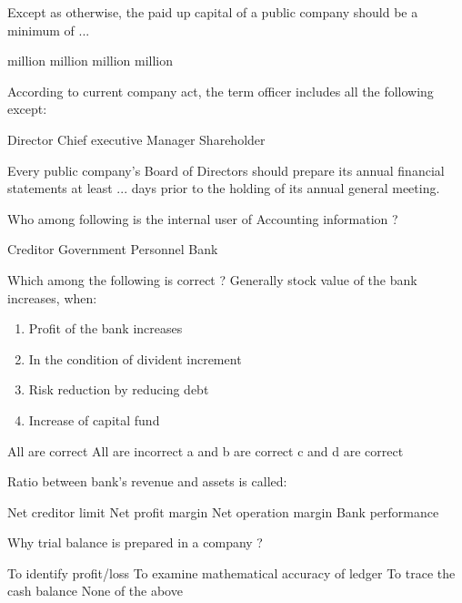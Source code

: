 \begin{questions}
\question Except as otherwise, the paid up capital of a public company should be a minimum of ...
  \begin{choices}
   million
   million
   million
   million
  \end{choices}

\question According to current company act, the term officer includes all the following except:
  \begin{choices}
  \choice Director
  \choice Chief executive
  \choice Manager
  \choice Shareholder
  \end{choices}

\question Every public company's Board of Directors should prepare its annual financial statements at least ... days prior to the holding of its annual general meeting.
  \begin{choices}
  \end{choices}

\question Who among following is the internal user of Accounting information ?
  \begin{choices}
  \choice Creditor
  \choice Government
  \choice Personnel
  \choice Bank
  \end{choices}

\question Which among the following is correct ? Generally stock value of the bank increases, when:
  \begin{enumerate}
  \item Profit of the bank increases
  \item In the condition of divident increment
  \item Risk reduction by reducing debt
  \item Increase of capital fund
  \end{enumerate}
  \begin{choices}
  \choice All are correct
  \choice All are incorrect
  \choice a and b are correct
  \choice c and d are correct
  \end{choices}

\question Ratio between bank's revenue and assets is called:
  \begin{choices}
  \choice Net creditor limit
  \choice Net profit margin
  \choice Net operation margin
  \choice Bank performance
  \end{choices}

\question Why trial balance is prepared in a company ?
  \begin{choices}
  \choice To identify profit/loss
  \choice To examine mathematical accuracy of ledger
  \choice To trace the cash balance
  \choice None of the above
  \end{choices}


\end{questions}
